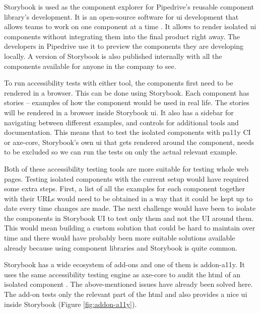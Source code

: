\documentclass{master_thesis}
\begin{document}
Storybook is used as the component explorer for Pipedrive's reusable component library's development. It is an open-source software for \ac{ui} development that allows teams to work on one component at a time \citep{storybook}. It allows to render isolated \ac{ui} components without integrating them into the final product right away. The developers in Pipedrive use it to preview the components they are developing locally. A version of Storybook is also published internally with all the components available for anyone in the company to see.

To run accessibility tests with either tool, the components first need to be rendered in a browser. This can be done using Storybook. Each component has stories – examples of how the component would be used in real life. The stories will be rendered in a browser inside Storybook \ac{ui}. It also has a sidebar for navigating between different examples, and controls for additional tools and documentation.
This means that to test the isolated components with pa11y CI or axe-core, Storybook's own \ac{ui} that gets rendered around the component, needs to be excluded so we can run the tests on only the actual relevant example.

Both of these accessibility testing tools are more suitable for testing whole web pages. Testing isolated components with the current setup would have required some extra steps. First, a list of all the examples for each component together with their URLs would need to be obtained in a way that it could be kept up to date every time changes are made. The next challenge would have been to isolate the components in Storybook UI to test only them and not the UI around them. This would mean building a custom solution that could be hard to maintain over time and there would have probably been more suitable solutions available already because using component libraries and Storybook is quite common.

Storybook has a wide ecosystem of add-ons and one of them is addon-a11y. It uses the same accessibility testing engine as axe-core to audit the \ac{html} of an isolated component \citep{addon-a11y}. The above-mentioned issues have already been solved here. The add-on tests only the relevant part of the \ac{html} and also provides a nice \ac{ui} inside Storybook (Figure \ref{fig:addon-a11y}).
\end{document}
